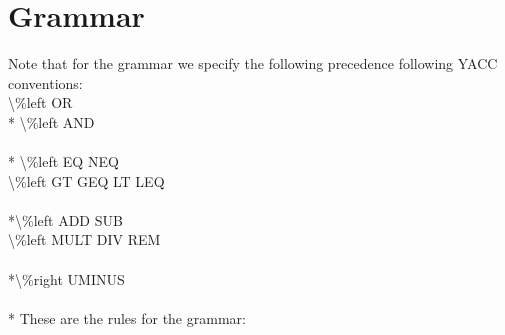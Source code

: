 \documentclass[11pt]{article}
\begin{document}
\section{Grammar}
\newlength{}
\newlength{}
\newlength{}
\settowidth{}
\settowidth{}
\setlength{}
\addtolength{}
\addtolength{}
\addtolength{}
Note that for the grammar we specify the following precedence following YACC conventions:
\\ \textbackslash\%left OR
\\* \textbackslash\%left AND
\\ \\* \textbackslash\%left EQ NEQ
\\ \textbackslash\%left GT GEQ LT LEQ
\\ \\*\textbackslash\%left ADD SUB
\\ \textbackslash\%left MULT DIV REM
\\ \\*\textbackslash\%right UMINUS
\\ \\* These are the rules for the grammar:
\end{document}
